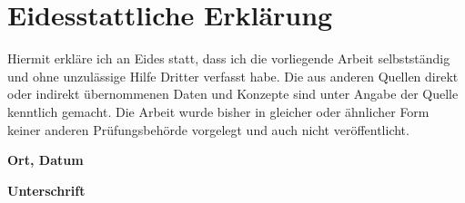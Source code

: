 
\newpage
\chapter{Eidesstattliche Erklärung}

Hiermit erkläre ich an Eides statt, dass ich die vorliegende Arbeit selbstständig und ohne unzulässige Hilfe Dritter verfasst habe. Die aus anderen Quellen direkt oder indirekt übernommenen Daten und Konzepte sind unter Angabe der Quelle kenntlich gemacht. Die Arbeit wurde bisher in gleicher oder ähnlicher Form keiner anderen Prüfungsbehörde vorgelegt und auch nicht veröffentlicht.

\vspace{2cm}

\textbf{Ort, Datum}

\vspace{1.5cm}

\textbf{Unterschrift}

